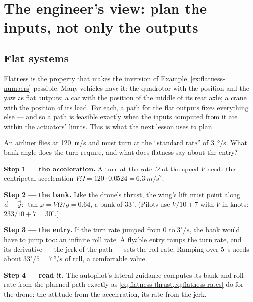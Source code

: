 \section{The engineer's view: plan the inputs, not only the outputs}

\subsection{Flat systems}
Flatness is the property that makes the inversion of Example~\ref{ex:flatness-numbers} possible. Many vehicles have it: the quadrotor with the position and the yaw as flat outputs; a car with the position of the middle of its rear axle; a crane with the position of its load. For each, a path for the flat outputs fixes everything else — and so a path is feasible exactly when the inputs computed from it are within the actuators' limits. This is what the next lesson uses to plan.

\begin{example}
\label{ex:flatness-aircraft}
An airliner flies at \SI{120}{m/s} and must turn at the \enquote{standard rate} of \SI{3}{\degree/s}. What bank angle does the turn require, and what does flatness say about the entry?

\textbf{Step 1 — the acceleration.} A turn at the rate $\Omega$ at the speed $V$ needs the centripetal acceleration $V\Omega = 120 \cdot 0.0524 = \SI{6.3}{m/s^2}$.

\textbf{Step 2 — the bank.} Like the drone's thrust, the wing's lift must point along $\vec a - \vec g$: $\tan\varphi = V\Omega/g = 0.64$, a bank of $33^\circ$. (Pilots use $V/10 + 7$ with $V$ in knots: $233/10 + 7 = 30^\circ$.)

\textbf{Step 3 — the entry.} If the turn rate jumped from 0 to $3^\circ/\si{s}$, the bank would have to jump too: an infinite roll rate. A flyable entry ramps the turn rate, and its derivative — the jerk of the path — sets the roll rate. Ramping over \SI{5}{s} needs about $33^\circ/5 = \SI{7}{\degree/s}$ of roll, a comfortable value.

\textbf{Step 4 — read it.} The autopilot's lateral guidance computes its bank and roll rate from the planned path exactly as \cref{eq:flatness-thrust,eq:flatness-rates} do for the drone: the attitude from the acceleration, its rate from the jerk.
\end{example}

